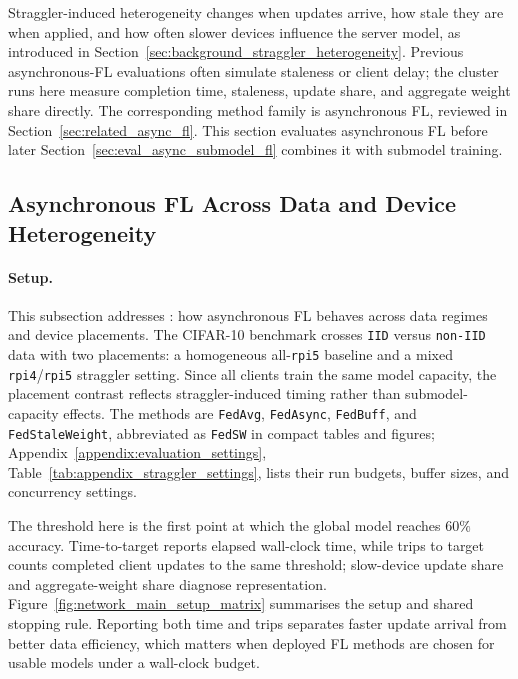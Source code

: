 Straggler-induced heterogeneity changes when updates arrive, how stale they are when applied, and how often slower devices influence the server model, as introduced in Section~\ref{sec:background_straggler_heterogeneity}. Previous asynchronous-FL evaluations often simulate staleness or client delay; the cluster runs here measure completion time, staleness, update share, and aggregate weight share directly. The corresponding method family is asynchronous FL, reviewed in Section~\ref{sec:related_async_fl}. This section evaluates asynchronous FL before later Section~\ref{sec:eval_async_submodel_fl} combines it with submodel training.

\FloatBarrier
\subsection{Asynchronous FL Across Data and Device Heterogeneity}

\paragraph{Setup.}
This subsection addresses : how asynchronous FL behaves across data regimes and device placements. The CIFAR-10 benchmark crosses \texttt{IID} versus \texttt{non-IID} data with two placements: a homogeneous all-\texttt{rpi5} baseline and a mixed \texttt{rpi4}/\texttt{rpi5} straggler setting. Since all clients train the same model capacity, the placement contrast reflects straggler-induced timing rather than submodel-capacity effects. The methods are \texttt{FedAvg}, \texttt{FedAsync}, \texttt{FedBuff}, and \texttt{FedStaleWeight}, abbreviated as \texttt{FedSW} in compact tables and figures; Appendix~\ref{appendix:evaluation_settings}, Table~\ref{tab:appendix_straggler_settings}, lists their run budgets, buffer sizes, and concurrency settings.

The threshold here is the first point at which the global model reaches \(60\%\) accuracy. Time-to-target reports elapsed wall-clock time, while trips to target counts completed client updates to the same threshold; slow-device update share and aggregate-weight share diagnose representation. Figure~\ref{fig:network_main_setup_matrix} summarises the setup and shared stopping rule. Reporting both time and trips separates faster update arrival from better data efficiency, which matters when deployed FL methods are chosen for usable models under a wall-clock budget.


